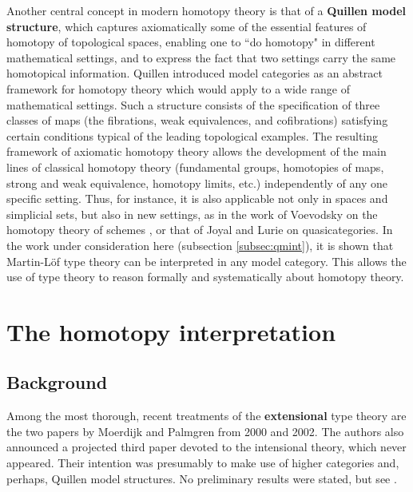\documentclass[reqno,12pt]{amsart}
\newcommand{\myemph}[1]{\textbf{#1}}    %
\theoremstyle{definition}
\theoremstyle{remark}
\begin{document}
Another central concept in modern homotopy theory is that of a \myemph{Quillen model structure}, which captures axiomatically some of the essential features of homotopy of topological spaces, enabling one to ``do homotopy" in different mathematical settings, and to express the fact that two settings carry the same homotopical information.  
Quillen \cite{Quillen:HA} introduced model categories as an abstract framework for homotopy theory 
which would apply to a wide range of mathematical settings. 
Such a structure consists of the specification of three classes of maps (the fibrations, weak equivalences, and cofibrations) satisfying certain conditions typical of the leading topological examples.    
The resulting framework of axiomatic homotopy theory allows the development of the main lines of classical homotopy theory (fundamental groups, homotopies of maps, strong and weak equivalence, homotopy limits, etc.) independently of any one specific setting.  Thus, for instance, it is also applicable not only in spaces and simplicial sets, but also in new settings, as in the work of Voevodsky on the homotopy theory of 
schemes \cite{Morel:A1HTS}, or that of Joyal \cite{Joyal:QCKC,Joyal:QC} and Lurie \cite{Lurie:HTT} on quasicategories.  In the work under consideration here (subsection \ref{subsec:qmint}), it is shown that Martin-L\"of type theory can be interpreted in any model category. This allows the use of type theory to reason formally and systematically about homotopy theory.

%
\section{The homotopy interpretation}


\subsection{Background}

Among the most thorough, recent treatments of the \myemph{extensional} type theory are the two papers \cite{MP:WFTC,MP:TTCST} %
by Moerdijk and Palmgren from 2000 and 2002.  The authors also announced a projected third paper devoted to the intensional theory, which never appeared.  Their intention was presumably to make use of higher categories and, perhaps, Quillen model structures.  No preliminary results were stated, but see \cite{Palmgren:GLCC}.
\end{document}
